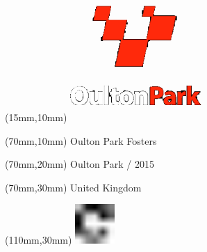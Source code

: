 \null\newpage
\begin{textblock*}{50mm}(15mm,10mm)%
\includegraphics[width=50mm]{LG/OUL.png}
\end{textblock*}
\begin{textblock*}{130mm}(70mm,10mm)%
{\fontsize{20}{20}\selectfont Oulton Park Fosters}\\
\end{textblock*}
\begin{textblock*}{120mm}(70mm,20mm)%
{\fontsize{16}{16}\selectfont Oulton Park / 2015}\\
\end{textblock*}
\begin{textblock*}{120mm}(70mm,30mm)%
{\fontsize{12}{12}\selectfont United Kingdom}
\end{textblock*}
\begin{textblock*}{30mm}(110mm,30mm)%
\centering
\includegraphics[height=15mm]{icons/fa-rotate-right.pdf}
\end{textblock*}
